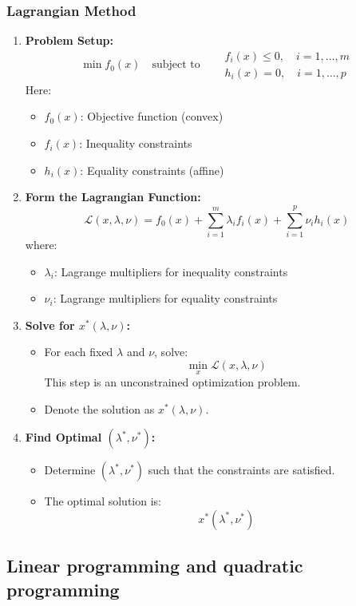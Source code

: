 \subsubsection{Lagrangian Method}
\begin{process}
    \begin{enumerate}
        \item \textbf{Problem Setup:}
        \[
        \min f_0(x) \quad \text{subject to} \quad 
        \begin{aligned}
            & f_i(x) \leq 0, \quad i = 1, \dots, m \\
            & h_i(x) = 0, \quad i = 1, \dots, p
        \end{aligned}
        \]
        Here:
        \begin{itemize}
            \item \( f_0(x) \): Objective function (convex)
            \item \( f_i(x) \): Inequality constraints
            \item \( h_i(x) \): Equality constraints (affine)
        \end{itemize}
    
        \item \textbf{Form the Lagrangian Function:}
        \[
        \mathcal{L}(x, \lambda, \nu) = f_0(x) + \sum_{i=1}^m \lambda_i f_i(x) + \sum_{i=1}^p \nu_i h_i(x)
        \]
        where:
        \begin{itemize}
            \item \( \lambda_i \): Lagrange multipliers for inequality constraints
            \item \( \nu_i \): Lagrange multipliers for equality constraints
        \end{itemize}
    
        \item \textbf{Solve for \( x^*(\lambda, \nu) \):}
        \begin{itemize}
            \item For each fixed \( \lambda \) and \( \nu \), solve:
            \[
            \min_x \mathcal{L}(x, \lambda, \nu)
            \]
            This step is an unconstrained optimization problem.
            \item Denote the solution as \( x^*(\lambda, \nu) \).
        \end{itemize}
    
        \item \textbf{Find Optimal \( (\lambda^*, \nu^*) \):}
        \begin{itemize}
            \item Determine \( (\lambda^*, \nu^*) \) such that the constraints are satisfied.
            \item The optimal solution is:
            \[
            x^*(\lambda^*, \nu^*)
            \]
        \end{itemize}
    \end{enumerate}
\end{process}
\subsection{Linear programming and quadratic programming}